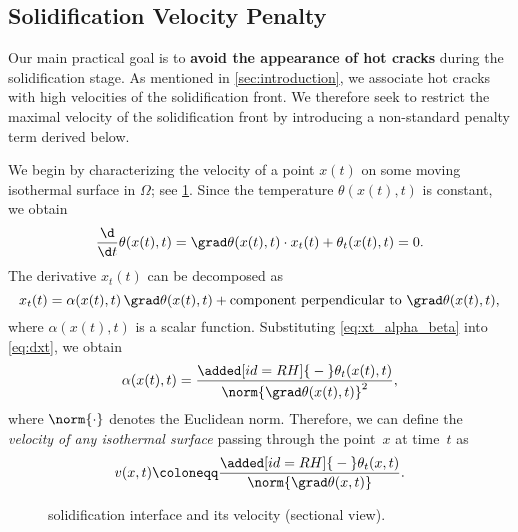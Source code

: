 \subsection{Solidification Velocity Penalty}
\label{subsec:velocity}

Our main practical goal is to \textbf{avoid the appearance of hot cracks} during the solidification stage. 
As mentioned in \cref{sec:introduction}, we associate hot cracks with high velocities of the solidification front.
We therefore seek to restrict the maximal velocity of the solidification front by introducing a non-standard penalty term derived below.

We begin by characterizing the velocity of a point $x(t)$ on some moving isothermal surface in $\Omega$; see \cref{fig:velocity}.
Since the temperature $\theta(x(t),t)$ is constant, we obtain
\begin{equation} \label{eq:dxt}
	\frac{\d}{\d t} \theta(x(t),t) 
	= 
	\grad \theta(x(t),t) \cdot x_t(t) + \theta_t(x(t),t) 
	= 
	0
	.
\end{equation}
The derivative $x_t(t)$ can be decomposed as
\begin{equation} \label{eq:xt_alpha_beta}
	x_t(t) 
	= 
	\alpha(x(t),t) \, \grad \theta(x(t),t) + \text{component perpendicular to } \grad \theta(x(t),t),
\end{equation}
where $\alpha(x(t),t)$ is a scalar function. 
Substituting \eqref{eq:xt_alpha_beta} into \eqref{eq:dxt}, we obtain 
\begin{equation}
	\alpha(x(t),t) 
	= 
	\frac{\added[id=RH]{{}-{}} \theta_t(x(t),t)}{\norm{\grad \theta(x(t),t)}^2}
	,
\end{equation}
where $\norm{\cdot}$ denotes the Euclidean norm.
Therefore, we can define the \emph{velocity of any isothermal surface} passing through the point~$x$ at time~$t$ as
\begin{equation}
	v(x,t) 
	\coloneqq 
	\frac{\added[id=RH]{{}-{}} \theta_t(x,t)}{\norm{\grad \theta(x,t)}}
	.
\end{equation}

\begin{figure}
	\centering
	
	\caption{ solidification interface and its velocity (sectional view).}
	\label{fig:velocity}
\end{figure}

